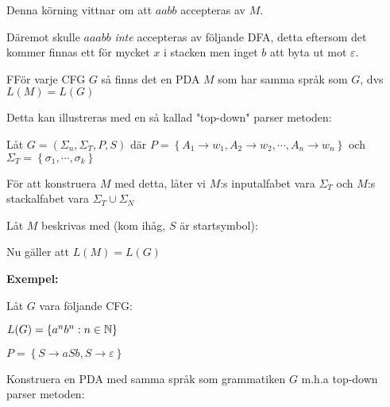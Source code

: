 \par\bigskip
\noindent Denna körning vittnar om att $aabb$ accepteras av $M$.\par
\noindent Däremot skulle $aaabb$ \textit{inte} accepteras av följande DFA, detta eftersom det kommer finnas ett för mycket $x$ i stacken men inget $b$ att byta ut mot $\varepsilon$.
\par\bigskip
\begin{theo}
  FFör varje CFG $G$ så finns det en PDA $M$ som har samma språk som $G$, dvs $L(M) = L(G)$
\end{theo}
\par\bigskip
\noindent Detta kan illustreras med en så kallad "top-down" parser metoden:\par
\noindent Låt $G = (\Sigma_n,\Sigma_T,P,S)$ där $P = \left\{A_1\to w_1, A_2\to w_2,\cdots, A_n\to w_n\right\}$ och $\Sigma_T = \left\{\sigma_1,\cdots, \sigma_k\right\}$
\par\bigskip
\noindent För att konstruera $M$ med detta, låter vi $M$:s inputalfabet vara $\Sigma_T$ och $M$:s stackalfabet vara $\Sigma_T\cup\Sigma_N$\par
\noindent Låt $M$ beskrivas med (kom ihåg, $S$ är startsymbol):
\begin{figure}[ht!]
    \centering
    \caption{}
\end{figure}
\par\bigskip
\noindent Nu gäller att $L(M) = L(G)$
\par\bigskip
\noindent\textbf{Exempel:}\par
\noindent Låt $G$ vara följande CFG:\par
$L(G) = \left\{a^nb^n:n\in\mathbb{N}\right\}$\par
$P = \left\{S\to aSb, S\to\varepsilon\right\}$\par
\noindent Konstruera en PDA med samma språk som grammatiken $G$ m.h.a top-down parser metoden:
